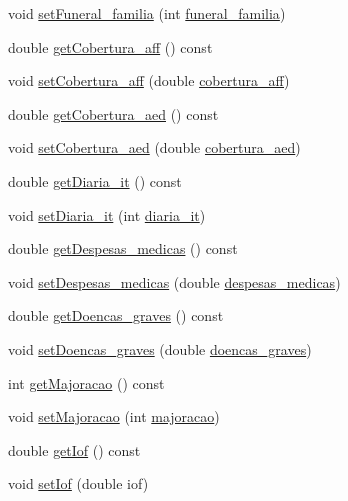 \begin{DoxyCompactItemize}
void \hyperlink{class_produto_ac666bfeeb31e8c988a039efca68e7d79}{set\+Funeral\+\_\+familia} (int \hyperlink{class_produto_a6fc727fd12d68f16a76fec4b9be086e7}{funeral\+\_\+familia})
\item 
double \hyperlink{class_produto_a9acf053a9b38ac53acca9e5dc33fa772}{get\+Cobertura\+\_\+aff} () const
\item 
void \hyperlink{class_produto_a544f9837a80bee41a47610ce03071757}{set\+Cobertura\+\_\+aff} (double \hyperlink{class_produto_afaebf7dcd9c82cf945aa6cbbe8a5d571}{cobertura\+\_\+aff})
\item 
double \hyperlink{class_produto_af4c6b062cf630f80c4064af0eed07486}{get\+Cobertura\+\_\+aed} () const
\item 
void \hyperlink{class_produto_afa6e7624fccfaa7437f193278dacab59}{set\+Cobertura\+\_\+aed} (double \hyperlink{class_produto_ae013ae980573787067774ec14ec21459}{cobertura\+\_\+aed})
\item 
double \hyperlink{class_produto_a85b9599abec0fb97bfe8f2b42dca1faf}{get\+Diaria\+\_\+it} () const
\item 
void \hyperlink{class_produto_a4546d6f5d6a517bcecc6decc9bea50f8}{set\+Diaria\+\_\+it} (int \hyperlink{class_produto_afefb98ad26b77c674a14a3f4607db0e7}{diaria\+\_\+it})
\item 
double \hyperlink{class_produto_a0954f672347abb9b57b2083af89ccde3}{get\+Despesas\+\_\+medicas} () const
\item 
void \hyperlink{class_produto_a8480cf3984c1298167fac87e079b10ca}{set\+Despesas\+\_\+medicas} (double \hyperlink{class_produto_a9df2c3ba3304f3084e914a5a1f548645}{despesas\+\_\+medicas})
\item 
double \hyperlink{class_produto_a6f63e718b470563a0f3c4093b59a6eb9}{get\+Doencas\+\_\+graves} () const
\item 
void \hyperlink{class_produto_ab53115d44dbb7856030aba832edd21bf}{set\+Doencas\+\_\+graves} (double \hyperlink{class_produto_ae09501fc8a8334a1af066660b16afeb7}{doencas\+\_\+graves})
\item 
int \hyperlink{class_produto_a1bd6a841c396cf5a079033b96b549c54}{get\+Majoracao} () const
\item 
void \hyperlink{class_produto_a1d7370992bebc864e3bbdf322f407c10}{set\+Majoracao} (int \hyperlink{class_produto_a0171a8d210819c3c3de0b8050ff6eff2}{majoracao})
\item 
double \hyperlink{class_produto_a47402c721426916109ac8ed35e4795ff}{get\+Iof} () const
\item 
void \hyperlink{class_produto_a12912055580ce4a6dbefd6ce926fd196}{set\+Iof} (double iof)

\end{DoxyCompactItemize}
